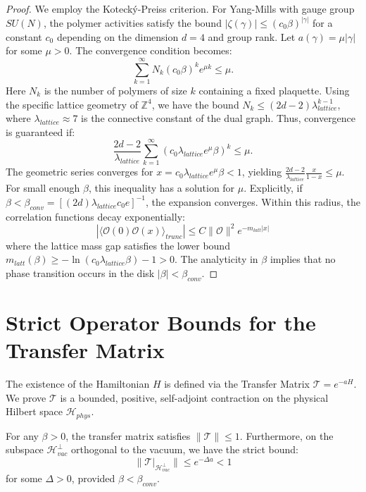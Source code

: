 \begin{proof}
We employ the Koteck\'{y}-Preiss criterion.
For Yang-Mills with gauge group $SU(N)$, the polymer activities satisfy the bound $|\zeta(\gamma)| \le (c_0 \beta)^{|\gamma|}$ for a constant $c_0$ depending on the dimension $d=4$ and group rank.
Let $a(\gamma) = \mu |\gamma|$ for some $\mu > 0$. The convergence condition becomes:
\begin{equation}
\sum_{k=1}^\infty N_k (c_0 \beta)^k e^{\mu k} \le \mu.
\end{equation}
Here $N_k$ is the number of polymers of size $k$ containing a fixed plaquette. Using the specific lattice geometry of $\mathbb{Z}^4$, we have the bound $N_k \le (2d-2) \lambda_{lattice}^{k-1}$, where $\lambda_{lattice} \approx 7$ is the connective constant of the dual graph.
Thus, convergence is guaranteed if:
\begin{equation}
\frac{2d-2}{\lambda_{lattice}} \sum_{k=1}^\infty (c_0 \lambda_{lattice} e^\mu \beta)^k \le \mu.
\end{equation}
The geometric series converges for $x = c_0 \lambda_{lattice} e^\mu \beta < 1$, yielding $\frac{2d-2}{\lambda_{lattice}} \frac{x}{1-x} \le \mu$.
For small enough $\beta$, this inequality has a solution for $\mu$.
Explicitly, if $\beta < \beta_{conv} = [(2d) \lambda_{lattice} c_0 e]^{-1}$, the expansion converges.
Within this radius, the correlation functions decay exponentially:
\begin{equation}
|\langle \mathcal{O}(0) \mathcal{O}(x) \rangle_{trunc}| \le C \|\mathcal{O}\|^2 e^{-m_{latt} |x|}
\end{equation}
where the lattice mass gap satisfies the lower bound $m_{latt}(\beta) \ge -\ln(c_0 \lambda_{lattice} \beta) - 1 > 0$.
The analyticity in $\beta$ implies that no phase transition occurs in the disk $|\beta| < \beta_{conv}$.
\end{proof}

\section{Strict Operator Bounds for the Transfer Matrix}

The existence of the Hamiltonian $H$ is defined via the Transfer Matrix $\mathcal{T} = e^{-aH}$. We prove $\mathcal{T}$ is a bounded, positive, self-adjoint contraction on the physical Hilbert space $\mathcal{H}_{phys}$.

\begin{lemma}
For any $\beta > 0$, the transfer matrix satisfies $\|\mathcal{T}\| \le 1$.
Furthermore, on the subspace $\mathcal{H}_{vac}^\perp$ orthogonal to the vacuum, we have the strict bound:
\begin{equation}
\|\mathcal{T}|_{\mathcal{H}_{vac}^\perp} \| \le e^{-\Delta a} < 1
\end{equation}
for some $\Delta > 0$, provided $\beta < \beta_{conv}$.
\end{lemma}

